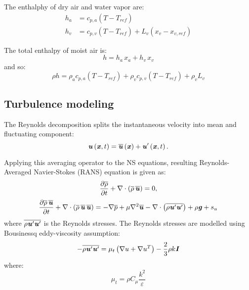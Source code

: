 The enthalphy of dry air and water vapor are:
\begin{align}
h_a &= c_{p,a} \left(T - T_{\mathit{ref}}\right) \\
h_v &= c_{p,v} \left(T - T_{\mathit{ref}}\right) + L_v \left(x_v - x_{v,ref}\right)
\end{align}

The total enthalpy of moist air is:
\begin{equation}
h = h_a \, x_a + h_v \, x_v
\end{equation}
and so:
\begin{equation}
\rho h = \rho_a c_{p,a} \left(T - T_{\mathit{ref}}\right) + \rho_v c_{p,v} \left(T - T_{\mathit{ref}}\right) + \rho_v L_v
\end{equation}

\subsection*{Turbulence modeling}

The Reynolds decomposition splits the instantaneous velocity into mean and fluctuating component:
\begin{equation}
\textbf{\textit{u}} \left(\textbf{\textit{x}},t\right) = \overline{\textbf{\textit{u}}} \left(\textbf{\textit{x}}\right) + \textbf{\textit{u}}' \left(\textbf{\textit{x}},t\right).
\end{equation}

Applying this averaging operator to the NS equations, resulting Reynolds-Averaged Navier-Stokes (RANS) equation is given as:
\begin{equation}
\frac{\partial \overline{\rho}}{\partial t} + \nabla \cdot \left(\overline{\rho}\,\overline{\textbf{\textit{u}}}\right) = 0,
\end{equation}
\begin{equation}
\frac{\partial \overline{\rho}\,\overline{\textbf{\textit{u}}}}{\partial t}  + \nabla \cdot \left(\overline{\rho}\,\overline{\textbf{\textit{u}}}\,\overline{\textbf{\textit{u}}}\right) = -\nabla \overline{p} + \mu \nabla^2 \overline{\textbf{\textit{u}}} - \nabla \cdot \left(\overline{\rho \textbf{\textit{u}}' \textbf{\textit{u}}'}\right)+ \rho \textbf{\textit{g}} + s_u
\end{equation}
where $\overline{\rho \textbf{\textit{u}}' \textbf{\textit{u}}'}$ is the Reynolds stresses. The Reynolds stresses are modelled using Bousinessq eddy-viscosity assumption:
\begin{equation}
- \overline{\rho \textbf{\textit{u}}' \textbf{\textit{u}}'} = \mu_t \left(\nabla u + \nabla u^T\right) - \frac{2}{3}\rho k \textbf{\textit{I}}
\end{equation}
where:
\begin{equation}
\mu_t = \rho C_\mu \frac{k^2}{\varepsilon}
\end{equation}

